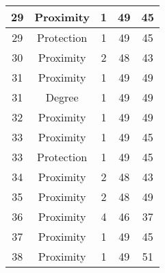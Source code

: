 \documentclass[results.tex]{subfiles}
\begin{document}
\begin{center}
\begin{tabular}{| c || c | c | c | c |}
            \hline
            29                      & Proximity                    & 1                      & 49                      & 45                   \\
            \hline
            29                      & Protection                   & 1                      & 49                      & 45                   \\
            \hline
            30                      & Proximity                    & 2                      & 48                      & 43                   \\
            \hline
            31                      & Proximity                    & 1                      & 49                      & 49                   \\
            \hline
            31                      & Degree                       & 1                      & 49                      & 49                   \\
            \hline
            32                      & Proximity                    & 1                      & 49                      & 49                   \\
            \hline
            33                      & Proximity                    & 1                      & 49                      & 45                   \\
            \hline
            33                      & Protection                   & 1                      & 49                      & 45                   \\
            \hline
            34                      & Proximity                    & 2                      & 48                      & 43                   \\
            \hline
            35                      & Proximity                    & 2                      & 48                      & 49                   \\
            \hline
            36                      & Proximity                    & 4                      & 46                      & 37                   \\
            \hline
            37                      & Proximity                    & 1                      & 49                      & 45                   \\
            \hline
            38                      & Proximity                    & 1                      & 49                      & 51                   \\

\end{tabular}
\end{center}
\end{document}

